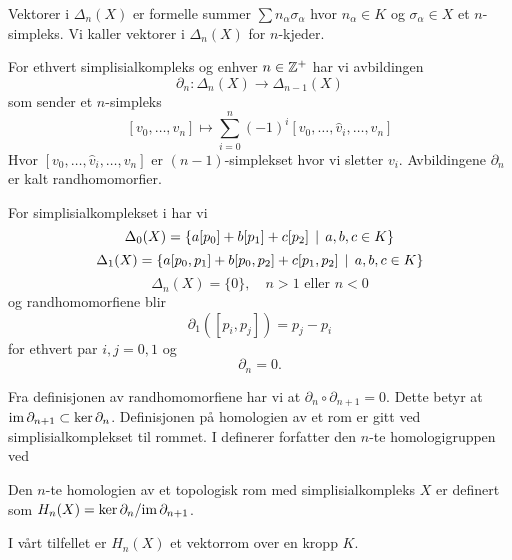 Vektorer i $\Delta_n(X)$ er formelle summer $\sum
n_\alpha\sigma_\alpha$ hvor $n_\alpha\in K$ og
$\sigma_\alpha\in X$ et $n$-simpleks. Vi kaller vektorer
i $\Delta_n(X)$ for $n$-kjeder. 

\begin{definisjon}\label{def:randhom}
  For ethvert simplisialkompleks og enhver $n\in\mathbb{Z}^+$
  har vi avbildingen 
  \[\partial_n: \Delta_n(X)\to\Delta_{n-1}(X)\]
  som sender et $n$-simpleks
  \[[v_0,\dots,v_n]\mapsto
  \sum_{i=0}^n(-1)^i[v_0,\dots,\hat{v}_i,\dots,v_n]\]
  Hvor $[v_0,\dots,\hat{v}_i,\dots,v_n]$ er
  $(n-1)$-simplekset hvor vi sletter $v_i$. Avbildingene
  $\partial_n$ er kalt randhomomorfier.
\end{definisjon}

\begin{eksempel}\label{eks:randhom}
  For simplisialkomplekset i 
  har vi
  \[\Delta_0(X) = \left\{a[p_0]+b[p_1]+c[p_2]\,\mid\,a,b,c\in K\right\}\]
  \[\Delta_1(X)
  = \left\{a[p_0,p_1]+b[p_0,p_2]+c[p_1,p_2]\,\mid\,a,b,c\in K\right\}\]
  \[\Delta_n(X) = \{0\},\quad n>1\text{ eller } n<0\]
  og randhomomorfiene blir
  \[\partial_1([p_i,p_j]) = p_j-p_i\]
  for ethvert par $i,j=0,1$ og
  \[\partial_n = 0.\]
\end{eksempel}

Fra definisjonen av randhomomorfiene har vi at
$\partial_n\circ\partial_{n+1}=0$. Dette betyr at
$\textnormal{im}\,\partial_{n+1}\subset\ker\partial_n$.
Definisjonen på homologien av et rom er gitt ved
simplisialkomplekset til rommet. I \citep[seksjon
2.1]{Hatcher2001} definerer forfatter den $n$-te
  homologigruppen ved

\begin{definisjon}\label{def:Homologi}
  Den $n$-te homologien av et topologisk rom med
  simplisialkompleks $X$ er definert
  som $H_n(X) = \ker\partial_n/\textnormal{im}\,\partial_{n+1}$.
\end{definisjon}

I vårt tilfellet er $H_n(X)$ et vektorrom over en kropp
$K$.

